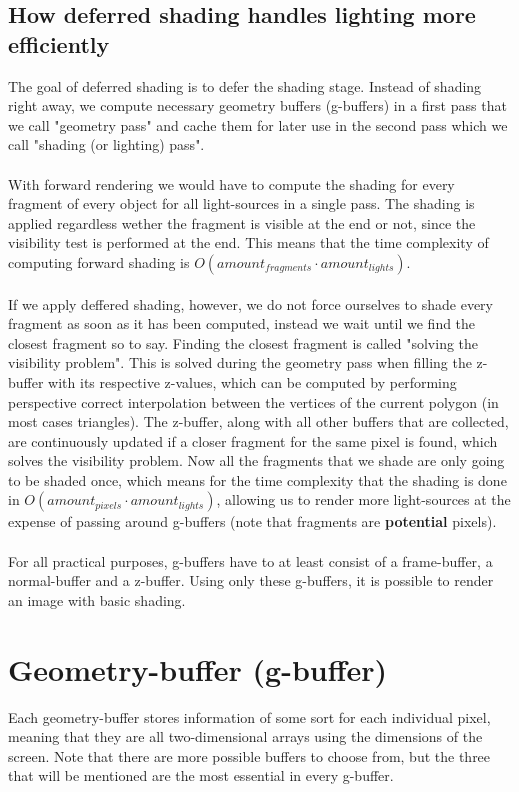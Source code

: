 \documentclass{ACGSeminar}
\begin{document}
	\subsection{How deferred shading handles lighting more efficiently}
		The goal of deferred shading is to defer the shading stage. Instead of shading right away, we compute necessary geometry buffers (g-buffers) in a first pass that we call "geometry pass" and cache 
		them for later use in the second pass which we call "shading (or lighting) pass". \\\\
		With forward rendering we would have to compute the shading for every fragment of every object for all light-sources in a single pass. The shading is applied regardless wether the fragment is visible at the end or not, since the visibility test is performed at the end. This means that the time complexity of computing forward shading is $O(amount_{fragments} \cdot amount_{lights})$. \\\\
		If we apply deffered shading, however, we do not force ourselves to shade every fragment as soon as it has been computed, instead we wait until we find the closest fragment so to say. Finding the closest fragment is called "solving the visibility problem". This is solved during the geometry pass when filling the z-buffer with its respective z-values, which can be computed by performing perspective correct interpolation between the vertices of the current polygon (in most cases triangles). The z-buffer, along with all other buffers that are collected, are continuously updated if a closer fragment for the same pixel is found, which solves the visibility problem. Now all the fragments that we shade are only going to be shaded once, which means for the time complexity that the shading is done in $O(amount_{pixels} \cdot amount_{lights})$, allowing us to render more light-sources at the expense of passing around g-buffers (note that fragments are \textbf{potential} pixels). \\\\
		For all practical purposes, g-buffers have to at least consist of a frame-buffer, a normal-buffer and a z-buffer. Using only these g-buffers, it is possible to render an image with basic shading.

\section{Geometry-buffer (g-buffer)}
	Each geometry-buffer stores information of some sort for each individual pixel, meaning that they are all two-dimensional arrays using the dimensions of the screen. Note that there are more possible buffers to choose from, but the three that will be mentioned are the most essential in every g-buffer.
\end{document}

